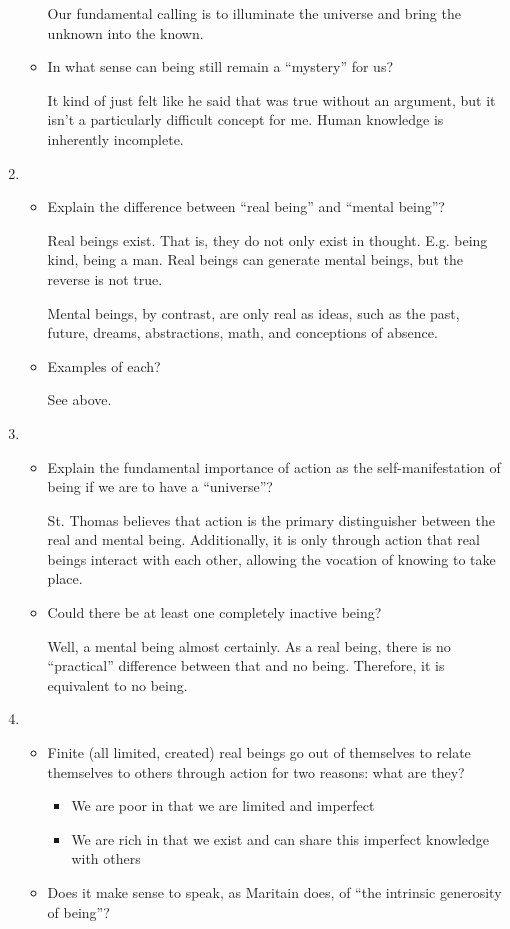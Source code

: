 \documentclass[12pt]{article}[titlepage]
\newcommand{\say}[1]{``#1''}
\newcommand{\1}{\={a}}
\newcommand{\2}{\={e}}
\newcommand{\3}{\={\i}}
\newcommand{\4}{\=o}
\newcommand{\5}{\=u}
\newcommand{\6}{\={A}}
\renewcommand{\,}{\textsuperscript{,}}
\begin{document}
\begin{enumerate}
\begin{itemize}
Our fundamental calling is to illuminate the universe and bring the unknown into the known.
\item In what sense can being still remain a \say{mystery} for us?

It kind of just felt like he said that was true without an argument, but it isn't a particularly difficult concept for me.
Human knowledge is inherently incomplete.
\end{itemize}
\item \begin{itemize}
\item Explain the difference between \say{real being} and \say{mental being}?

Real beings exist.
That is, they do not only exist in thought.
E.g. being kind, being a man.
Real beings can generate mental beings, but the reverse is not true.

Mental beings, by contrast, are only real as ideas, such as the past, future, dreams, abstractions, math, and conceptions of absence.
\item Examples of each?

See above.
\end{itemize}
\item \begin{itemize}
\item Explain the fundamental importance of action as the self-manifestation of being if we are to have a \say{universe}?

St. Thomas believes that action is the primary distinguisher between the real and mental being.
Additionally, it is only through action that real beings interact with each other, allowing the vocation of knowing to take place.

\item Could there be at least one completely inactive being?

Well, a mental being almost certainly.
As a real being, there is no \say{practical} difference between that and no being.
Therefore, it is equivalent to no being.
\end{itemize}
\item \begin{itemize}
\item Finite (all limited, created) real beings go out of themselves to relate themselves to others through action for two reasons: what are they?

\begin{itemize}
\item We are poor in that we are limited and imperfect
\item We are rich in that we exist and can share this imperfect knowledge with others
\end{itemize}
\item Does it make sense to speak, as Maritain does, of \say{the intrinsic generosity of being}?


\end{itemize}
\end{enumerate}
\end{document}
